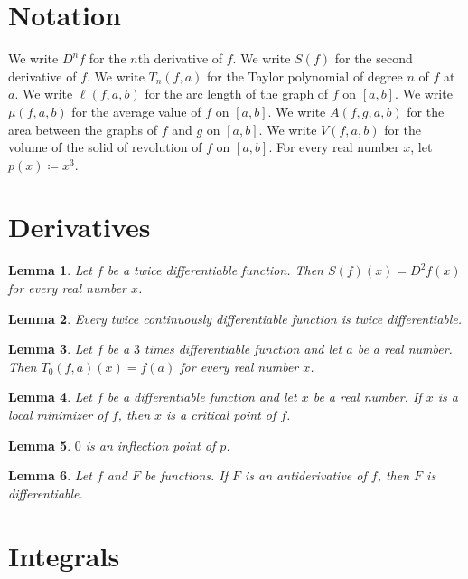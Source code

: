 \documentclass{article}
\newtheorem{lemma}{Lemma}
\begin{document}
\section{Notation}

We write $D^n f$ for the $n$th derivative of $f$.
We write $S(f)$ for the second derivative of $f$.
We write $T_n(f,a)$ for the Taylor polynomial of degree $n$ of $f$ at $a$.
We write $\ell(f,a,b)$ for the arc length of the graph of $f$ on $[a,b]$.
We write $\mu(f,a,b)$ for the average value of $f$ on $[a,b]$.
We write $A(f,g,a,b)$ for the area between the graphs of $f$ and $g$ on $[a,b]$.
We write $V(f,a,b)$ for the volume of the solid of revolution of $f$ on $[a,b]$.
For every real number $x$, let $p(x)\coloneqq x^3$.

\section{Derivatives}

\begin{lemma}\label{second}
Let $f$ be a twice differentiable function. Then $S(f)(x)=D^2f(x)$ for every real number $x$.
\end{lemma}

\begin{lemma}\label{times}
Every twice continuously differentiable function is twice differentiable.
\end{lemma}

\begin{lemma}\label{taylor}
Let $f$ be a $3$ times differentiable function and let $a$ be a real number. Then $T_0(f,a)(x)=f(a)$ for every real number $x$.
\end{lemma}

\begin{lemma}\label{critical}
Let $f$ be a differentiable function and let $x$ be a real number. If $x$ is a local minimizer of $f$, then $x$ is a critical point of $f$.
\end{lemma}

\begin{lemma}\label{inflection}
$0$ is an inflection point of $p$.
\end{lemma}

\begin{lemma}\label{antiderivative}
Let $f$ and $F$ be functions. If $F$ is an antiderivative of $f$, then $F$ is differentiable.
\end{lemma}

\section{Integrals}
\end{document}
